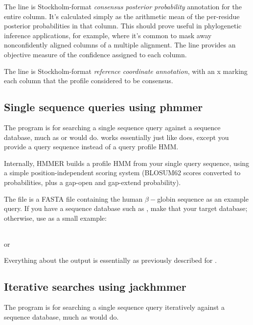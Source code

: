 The  line is Stockholm-format \emph{consensus
posterior probability} annotation for the entire column. It's
calculated simply as the arithmetic mean of the per-residue posterior
probabilities in that column. This should prove useful in phylogenetic
inference applications, for example, where it's common to mask away
nonconfidently aligned columns of a multiple alignment. The
 line provides an objective measure of the confidence
assigned to each column.

The  line is Stockholm-format \emph{reference
  coordinate annotation}, with an x marking each column that the
profile considered to be consensus.

\subsection{Single sequence queries using phmmer}

The  program is for searching a single sequence query
against a sequence database, much as  or 
would do.  works essentially just like 
does, except you provide a query sequence instead of a query profile
HMM. 

Internally, HMMER builds a profile HMM from your single query
sequence, using a simple position-independent scoring system (BLOSUM62
scores converted to probabilities, plus a gap-open and gap-extend
probability).

The file  is a FASTA file containing the
human $\beta-$globin sequence as an example query. If you have a
sequence database such as , make that your
target database; otherwise, use  as a
small example:

\\
or\\

Everything about the output is essentially as previously described for
. 


\subsection{Iterative searches using jackhmmer}

The  program is for searching a single sequence query
iteratively against a sequence database, much as 
would do. 

